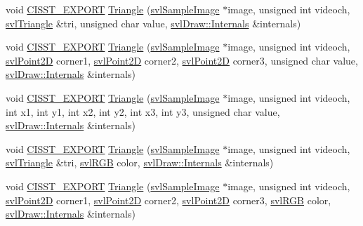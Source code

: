 \begin{DoxyCompactItemize}
\item 
void \hyperlink{cmn_export_macros_8h_a99393e0c3ac434b2605235bbe20684f8}{C\-I\-S\-S\-T\-\_\-\-E\-X\-P\-O\-R\-T} \hyperlink{namespacesvl_draw_a43971f54fdbb76a7713066278014c693}{Triangle} (\hyperlink{classsvl_sample_image}{svl\-Sample\-Image} $\ast$image, unsigned int videoch, \hyperlink{structsvl_triangle}{svl\-Triangle} \&tri, unsigned char value, \hyperlink{classsvl_draw_1_1_internals}{svl\-Draw\-::\-Internals} \&internals)
\item 
void \hyperlink{cmn_export_macros_8h_a99393e0c3ac434b2605235bbe20684f8}{C\-I\-S\-S\-T\-\_\-\-E\-X\-P\-O\-R\-T} \hyperlink{namespacesvl_draw_ad44d9f068bd3ff03dc1d4a651716b3b6}{Triangle} (\hyperlink{classsvl_sample_image}{svl\-Sample\-Image} $\ast$image, unsigned int videoch, \hyperlink{structsvl_point2_d}{svl\-Point2\-D} corner1, \hyperlink{structsvl_point2_d}{svl\-Point2\-D} corner2, \hyperlink{structsvl_point2_d}{svl\-Point2\-D} corner3, unsigned char value, \hyperlink{classsvl_draw_1_1_internals}{svl\-Draw\-::\-Internals} \&internals)
\item 
void \hyperlink{cmn_export_macros_8h_a99393e0c3ac434b2605235bbe20684f8}{C\-I\-S\-S\-T\-\_\-\-E\-X\-P\-O\-R\-T} \hyperlink{namespacesvl_draw_a05a4ceefdaa5c2d4bfce3aa9ff4a7cbe}{Triangle} (\hyperlink{classsvl_sample_image}{svl\-Sample\-Image} $\ast$image, unsigned int videoch, int x1, int y1, int x2, int y2, int x3, int y3, unsigned char value, \hyperlink{classsvl_draw_1_1_internals}{svl\-Draw\-::\-Internals} \&internals)
\item 
void \hyperlink{cmn_export_macros_8h_a99393e0c3ac434b2605235bbe20684f8}{C\-I\-S\-S\-T\-\_\-\-E\-X\-P\-O\-R\-T} \hyperlink{namespacesvl_draw_ae3ddae7f8b642aacd441eb5db4b783ea}{Triangle} (\hyperlink{classsvl_sample_image}{svl\-Sample\-Image} $\ast$image, unsigned int videoch, \hyperlink{structsvl_triangle}{svl\-Triangle} \&tri, \hyperlink{structsvl_r_g_b}{svl\-R\-G\-B} color, \hyperlink{classsvl_draw_1_1_internals}{svl\-Draw\-::\-Internals} \&internals)
\item 
void \hyperlink{cmn_export_macros_8h_a99393e0c3ac434b2605235bbe20684f8}{C\-I\-S\-S\-T\-\_\-\-E\-X\-P\-O\-R\-T} \hyperlink{namespacesvl_draw_a859c6870ca3bc4d46ed05133ebd3f8ae}{Triangle} (\hyperlink{classsvl_sample_image}{svl\-Sample\-Image} $\ast$image, unsigned int videoch, \hyperlink{structsvl_point2_d}{svl\-Point2\-D} corner1, \hyperlink{structsvl_point2_d}{svl\-Point2\-D} corner2, \hyperlink{structsvl_point2_d}{svl\-Point2\-D} corner3, \hyperlink{structsvl_r_g_b}{svl\-R\-G\-B} color, \hyperlink{classsvl_draw_1_1_internals}{svl\-Draw\-::\-Internals} \&internals)

\end{DoxyCompactItemize}
